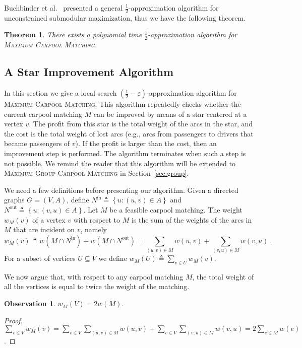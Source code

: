 \documentclass[11pt]{article}
\newtheorem{observation}[lemma]{Observation}
\newtheorem{theorem}{Theorem}
\newcommand{\set}[1]{\left\{ #1 \right\}}
\newcommand{\eqdf}{\triangleq}
\newcommand{\half}{\frac{1}{2}}
\newcommand{\nin}[1][M]{N^{\text{in}}_{#1}}
\newcommand{\nout}[1][M]{N^{\text{out}}_{#1}}
\newcommand{\carpool}{\textsc{Maximum Carpool Matching}\xspace}
\newcommand{\gcp}{\textsc{Maximum Group Carpool Matching}\xspace}
\newcommand{\eps}{\varepsilon}
\begin{document}
Buchbinder et al.~\cite{BFNS15,buchbinder2016deterministic} presented
a general $\half$-approximation algorithm for unconstrained
submodular maximization, thus we have the following theorem.

\begin{theorem}
There exists a polynomial time $\half$-approximation algorithm
for \carpool.
\end{theorem}


\subsection{A Star Improvement Algorithm}
\label{sec:improve}

In this section we give a local search $(\half-\eps)$-approximation
algorithm for \carpool.  This algorithm repeatedly checks whether the
current carpool matching $M$ can be improved by means of a star
centered at a vertex $v$.  The profit from this star is the total
weight of the arcs in the star, and the cost is the total weight of
lost arcs (e.g., arcs from passengers to drivers that became
passengers of $v$).  If the profit is larger than the cost, then an
improvement step is performed.  The algorithm terminates when such a
step is not possible.
%
We remind the reader that this algorithm will be extended to \gcp in
Section~\ref{sec:group}.

We need a few definitions before presenting our algorithm.
%
Given a directed graphs $G = (V,A)$, define $\nin[] \eqdf \set{u :
(u,v) \in A}$ and $\nout[] \eqdf \set{u : (v,u) \in A}$.
%
Let $M$ be a feasible carpool matching.  The weight $w_M(v)$ of a
vertex $v$ with respect to $M$ is the sum of the weights of the arcs
in $M$ that are incident on $v$, namely
\[
\textstyle
w_M(v)
\eqdf w(M \cap \nin[]) + w(M \cap \nout[])
=     \sum_{(u, v) \in M} w(u, v) + \sum_{(v, u) \in M} w(v, u)
~.
\]
For a subset of vertices $U \subseteq V$ we define
$w_M(U) \eqdf \sum_{v \in U} w_M(v)$.

We now argue that, with respect to any carpool matching $M$, the total
weight of all the vertices is equal to twice the weight of the matching.

\begin{observation}
\label{lm:val-twice}
$w_M(V) = 2 w(M)$.
\end{observation}
\begin{proof}
\(
\displaystyle
\sum_{v \in V} w_M(v)
= \sum_{v \in V} \sum_{(u, v) \in M} w(u, v) +
    \sum_{v \in V} \sum_{(v, u) \in M} w(v, u) 
= 2 \sum_{e \in M} w(e)
\).
\end{proof}
\end{document}
